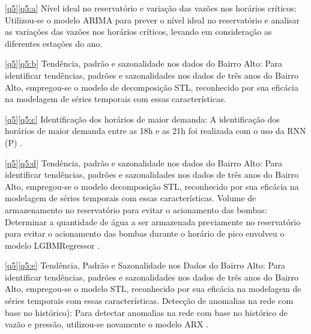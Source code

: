 \ref{q5}\eqref{q5:a} Nível ideal no reservatório e variação das vazões nos horários críticos: Utilizou-se o modelo ARIMA  \cite{2-s2.0-85069459067} para prever o nível ideal no reservatório e analisar as variações das vazões nos horários críticos, levando em consideração as diferentes estações do ano.

\ref{q5}\eqref{q5:b} Tendência, padrão e sazonalidade nos dados do Bairro Alto: Para identificar tendências, padrões e sazonalidades nos dados de três anos do Bairro Alto, empregou-se o modelo de decomposição STL, reconhecido por sua eficácia na modelagem de séries temporais com essas características.

\ref{q5}\eqref{q5:c} Identificação dos horários de maior demanda: A identificação dos horários de maior demanda entre as 18h e as 21h foi realizada com o uso da RNN (P) \cite{2-s2.0-85067419084}.

\ref{q5}\eqref{q5:d} Tendência, padrão e sazonalidade nos dados do Bairro Alto: Para identificar tendências, padrões e sazonalidades nos dados de três anos do Bairro Alto, empregou-se o modelo decomposição STL, reconhecido por sua eficácia na modelagem de séries temporais com essas características. Volume de armazenamento no reservatório para evitar o acionamento das bombas: Determinar a quantidade de água a ser armazenada previamente no reservatório para evitar o acionamento das bombas durante o horário de pico envolveu o modelo LGBMRegressor .

\ref{q5}\eqref{q5:e} Tendência, Padrão e Sazonalidade nos Dados do Bairro Alto: Para identificar tendências, padrões e sazonalidades nos dados de três anos do Bairro Alto, empregou-se o modelo STL, reconhecido por sua eficácia na modelagem de séries temporais com essas características. Detecção de anomalias na rede com base no histórico): Para detectar anomalias na rede com base no histórico de vazão e pressão, utilizou-se novamente o modelo ARX \cite{2-s2.0-85051469381}.










